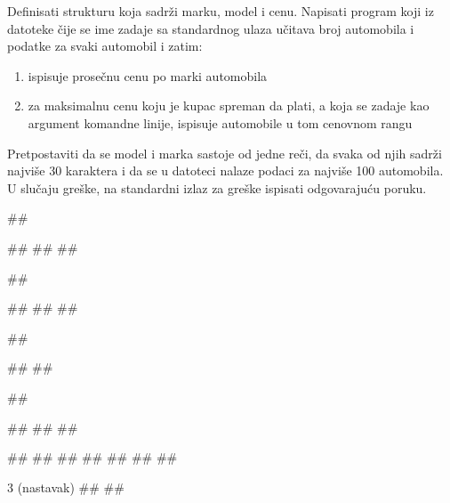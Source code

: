 \begin{Answer}[ref=v3_05]
\newpage
\end{Answer}


\begin{Exercise}[label=v3_06] 
Definisati strukturu  koja sadrži marku, model i cenu.
Napisati program koji iz datoteke čije se ime zadaje sa standardnog ulaza učitava broj automobila
i podatke za svaki automobil i zatim:
\begin{enumerate}
\setlength\itemsep{0em}
\item ispisuje prosečnu cenu po marki automobila 
\item za maksimalnu cenu koju je kupac spreman da plati, a koja se
zadaje kao argument komandne linije, ispisuje automobile u tom cenovnom
rangu
\end{enumerate}
Pretpostaviti da se model i marka sastoje od jedne reči, da svaka od njih sadrži najviše 30 karaktera i da se u datoteci
nalaze podaci za najviše 100 automobila.
U slučaju greške, na standardni izlaz za greške ispisati odgovarajuću poruku.

\begin{miditest}
\begin{upotreba}{1}
##

#\naslovInt#
##
##

##

#\naslovIzlazZaGresku#
##
##
\end{upotreba}
\end{miditest}
\begin{miditest}
\begin{upotreba}{2}
##

#\naslovIzlazZaGresku#
##
\end{upotreba}
\end{miditest}


\begin{miditest}
\begin{upotreba}{3}
##

#\naslovInt#
##
##

##
##
##
##
##
##
##
\end{upotreba}
\end{miditest}
\begin{miditest}
\begin{upotreba}{3 (nastavak)}
##
##


\end{upotreba}
\end{miditest}
\end{Exercise}
